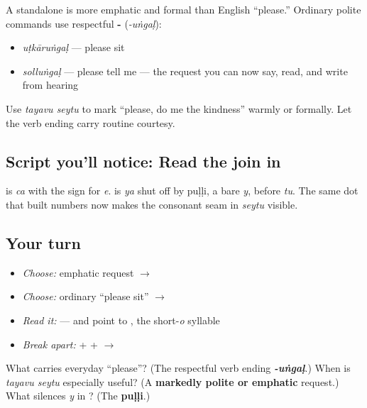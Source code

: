 \begin{culture}
A standalone \textbf{} is more emphatic and formal than English \textquotedblleft{}please.\textquotedblright{} Ordinary polite commands use respectful \textbf{-} (\emph{-uṅgaḷ}):

\begin{itemize}
\raggedright
  \item \textbf{} \emph{uṭkāruṅgaḷ} — please sit
  \item \textbf{} \emph{solluṅgaḷ} — please tell me — the request you can now say, read, and write from hearing
\end{itemize}

Use \emph{tayavu seytu} to mark \textquotedblleft{}please, do me the kindness\textquotedblright{} warmly or formally. Let the verb ending carry routine courtesy.
\end{culture}

\subsection*{Script you'll notice: Read the join in }
\textbf{} is \emph{ca} with the \textbf{} sign for \emph{e}. \textbf{} is \emph{ya} shut off by puḷḷi, a bare \emph{y}, before \textbf{} \emph{tu}. The same dot that built numbers now makes the consonant seam in \emph{seytu} visible.

\subsection*{Your turn}
\begin{itemize}
\raggedright
  \item \emph{Choose:} emphatic request $\to$ \textbf{}
  \item \emph{Choose:} ordinary \textquotedblleft{}please sit\textquotedblright{} $\to$ \textbf{}
  \item \emph{Read it:} \textbf{} — and point to \textbf{}, the short-\emph{o} syllable
  \item \emph{Break apart:}  +  +  $\to$ 
\end{itemize}

\begin{tcolorbox}[breakable,colback=teal!4,colframe=teal!35!black,title={Before you move on}]
What carries everyday \textquotedblleft{}please\textquotedblright{}? (The respectful verb ending \emph{\textbf{-uṅgaḷ}}.) When is \emph{tayavu seytu} especially useful? (A \textbf{markedly polite or emphatic} request.) What silences \emph{y} in \textbf{}? (The \textbf{puḷḷi}.)
\end{tcolorbox}
